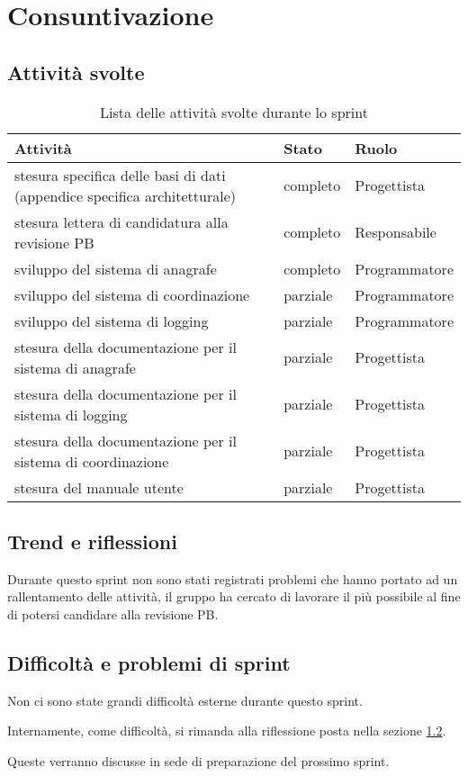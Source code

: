 \section{Consuntivazione}

\subsection{Attività svolte}

\begin{table}[H]
    \begin{xltabular}{\textwidth}{X l l}

         \textbf{Attività} & \textbf{Stato} & \textbf{Ruolo}\\
        \endhead
        \hline
        stesura specifica delle basi di dati (appendice specifica architetturale) & completo & Progettista \\
        stesura lettera di candidatura alla revisione PB & completo & Responsabile \\
        sviluppo del sistema di anagrafe & completo & Programmatore \\
        sviluppo del sistema di coordinazione & parziale & Programmatore \\
        sviluppo del sistema di logging & parziale & Programmatore \\
        stesura della documentazione per il sistema di anagrafe & parziale & Progettista \\
        stesura della documentazione per il sistema di logging & parziale & Progettista \\
        stesura della documentazione per il sistema di coordinazione & parziale & Progettista \\
        stesura del manuale utente & parziale & Progettista \\
    \end{xltabular}
    \caption{Lista delle attività svolte durante lo sprint}
\end{table}

\subsection{Trend e riflessioni}\label{subsec:trend}

Durante questo sprint non sono stati registrati problemi che hanno portato ad un rallentamento delle attività, il gruppo ha cercato di lavorare il più possibile al fine di potersi candidare alla revisione PB.

\subsection{Difficoltà e problemi di sprint}

Non ci sono state grandi difficoltà esterne durante questo sprint.

Internamente, come difficoltà, si rimanda alla riflessione posta nella sezione \ref{subsec:trend}.

Queste verranno discusse in sede di preparazione del prossimo sprint.